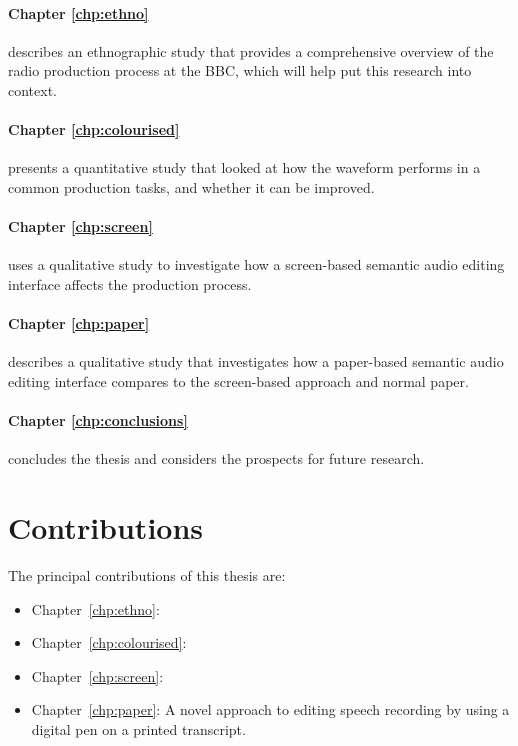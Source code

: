 \paragraph{Chapter \ref{chp:ethno}} describes an ethnographic study that provides a comprehensive overview of the radio
production process at the BBC, which will help put this research into context.

\paragraph{Chapter \ref{chp:colourised}} presents a quantitative study that looked at how the waveform performs in a
common production tasks, and whether it can be improved.

\paragraph{Chapter \ref{chp:screen}} uses a qualitative study to investigate how a screen-based semantic audio editing
interface affects the production process.

\paragraph{Chapter \ref{chp:paper}} describes a qualitative study that investigates how a paper-based semantic audio
editing interface compares to the screen-based approach and normal paper.

\paragraph{Chapter \ref{chp:conclusions}} concludes the thesis and considers the prospects for future research.

\section{Contributions}\label{sec:intro-contributions}

The principal contributions of this thesis are:
\begin{itemize}
  \item Chapter~\ref{chp:ethno}: 
  \item Chapter~\ref{chp:colourised}: 
  \item Chapter~\ref{chp:screen}: 
  \item Chapter~\ref{chp:paper}:
    A novel approach to editing speech recording by using a digital pen on a printed transcript.
\end{itemize}

